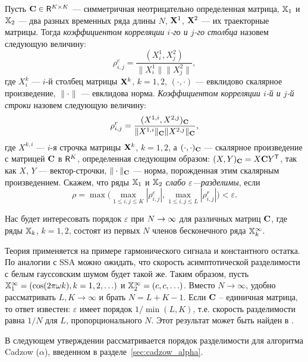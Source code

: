 \documentclass[12pt, specialist, subf,href,colorlinks=true,substylefile = spbu.rtx]{disser}
\theoremstyle{remark}
\theoremstyle{definition}
\begin{document}
Пусть $\mathbf{C} \in \mathsf{R}^{K \times K}$ --- симметричная неотрицательно определенная матрица, $\mathbb{X}_1$ и $\mathbb{X}_2$ ---  два разных временных ряда длины $N$, $\mathbf{X}^1$, $\mathbf{X}^2$ --- их траекторные матрицы. Тогда \emph{коэффициентом корреляции $i$-го и $j$-го столбца} назовем следующую величину:
\begin{equation}\label{col_corr}
\rho^c_{i,j} = \frac{(X^1_i, X^2_j)}{\|X^1_i\| \|X^2_j\|},
\end{equation}
где $X^k_i$ --- $i$-й столбец матрицы $\mathbf{X}^k$, $k = 1, 2$, $(\cdot, \cdot)$ --- евклидово скалярное произведение, $\|\cdot\|$ --- евклидова норма. \emph{Коэффициентом корреляции $i$-й и $j$-й строки} назовем следующую величину:
\begin{equation}\label{row_corr}
\rho^r_{i,j} = \frac{(X^{1,i}, X^{2,j})_{\mathbf{C}}}{\|X^{1,i}\|_{\mathbf{C}} \|X^{2,j}\|_{\mathbf{C}}},
\end{equation}
где $X^{k,i}$ --- $i$-я строчка матрицы $\mathbf{X}^k$, $k = 1, 2$, а $(\cdot, \cdot)_{\mathbf{C}}$ --- скалярное произведение с матрицей $\mathbf{C}$ в $\mathsf{R}^K$, определенная следующим образом: $(X, Y)_{\mathbf{C}} = X \mathbf{C} Y^{\mathsf{T}}$, так как $X$, $Y$ --- вектор-строчки, $\| \cdot \|_{\mathbf{C}}$ --- норма, порожденная этим скалярным произведением. Скажем, что ряды $\mathbb{X}_1$ и $\mathbb{X}_2$ \emph{слабо $\varepsilon$---разделимы}, если
\begin{equation}\label{weak_sep_eq}
\rho = \max\Big(\max_{1 \le i,j \le K}|\rho^c_{i,j}|, \max_{1 \le i,j \le L}|\rho^r_{i,j}|\Big) < \varepsilon.
\end{equation}

Нас будет интересовать порядок $\varepsilon$ при $N\rightarrow \infty$ для различных матриц $\mathbf{C}$, где ряды $\mathbb{X}_k$, $k=1,2$, состоят из первых $N$ членов бесконечного ряда $\mathbb{X}_k^\infty$.

Теория применяется на примере гармонического сигнала и константного остатка. По аналогии с SSA можно ожидать, что скорость асимптотической разделимости с белым гауссовским шумом будет такой же.
Таким образом, пусть
$\mathbb{X}_1^\infty = (\cos(2 \pi \omega k), k = 1, 2, \ldots)$ и  $\mathbb{X}_2^\infty = (c, c, \ldots)$. Вместо $N \to \infty$, удобно рассматривать $L,K \to \infty$ и брать $N = L + K - 1$. Если $\mathbf{C}$ -- единичная матрица, то ответ известен: $\varepsilon$ имеет порядок $1/\min(L,K)$, т.е. скорость разделимости равна $1/N$ для $L$, пропорционального $N$.
Этот результат может быть найден в \cite[глава 6.1]{Golyandina.etal2001}.

\smallskip
В следующем утверждении рассматривается порядок разделимости для алгоритма Cadzow ($\alpha$), введенном в разделе~\ref{sec:cadzow_alpha}.
\end{document}
